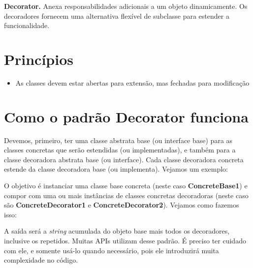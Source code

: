 \documentclass[a4paper,11pt]{report}
\begin{document}
\textbf{Decorator.} Anexa responsabilidades adicionais a um objeto dinamicamente. Os decoradores fornecem uma alternativa flexível de subclasse para estender a funcionalidade.

\section{Princípios}

\begin{itemize}
\item As classes devem estar abertas para extensão, mas fechadas para modificação
\end{itemize}

\section{Como o padrão Decorator funciona}

Devemos, primeiro, ter uma classe abstrata base (ou interface base) para as classes concretas que serão estendidas (ou implementadas), e também para a classe decoradora abstrata base (ou interface). Cada classe decoradora concreta estende da classe decoradora base (ou implementa). Vejamos um exemplo:\\






O objetivo é instanciar uma classe base concreta (neste caso \textbf{ConcreteBase1}) e compor com uma ou mais instâncias de classes concretas decoradoras (neste caso são \textbf{ConcreteDecorator1} e \textbf{ConcreteDecorator2}). Vejamos como fazemos isso:


A saída será a \textit{string} acumulada do objeto base mais todos os decoradores, inclusive os repetidos. Muitas APIs utilizam desse padrão. É preciso ter cuidado com ele, e somente usá-lo quando necessário, pois ele introduzirá muita complexidade no código.
\end{document}
